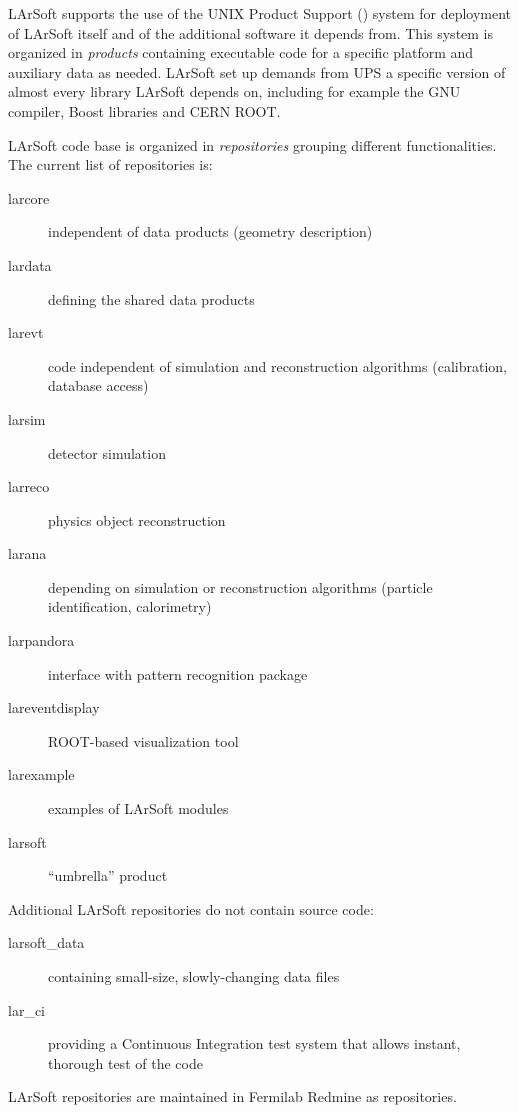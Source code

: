 
LArSoft supports the use of the UNIX Product Support (\UPS) system
for deployment of LArSoft itself and of the additional software it depends from.
This system is organized in \emph{products} containing executable code for a specific platform
and auxiliary data as needed.
LArSoft set up demands from UPS a specific version of almost every library LArSoft depends on,
including for example the GNU compiler, Boost libraries and CERN ROOT.

LArSoft code base is organized in \emph{repositories} grouping different functionalities.
The current list of repositories is:
\begin{description}
   \item[larcore] independent of data products (\eg geometry description)
   \item[lardata] defining the shared data products
   \item[larevt] code independent of simulation and reconstruction algorithms (\eg calibration, database access)
   \item[larsim] detector simulation
   \item[larreco] physics object reconstruction
   \item[larana] depending on simulation or reconstruction algorithms (\eg particle identification, calorimetry)
   \item[larpandora] interface with pattern recognition package \Pandora
   \item[lareventdisplay] ROOT-based visualization tool
   \item[larexample] examples of LArSoft modules
   \item[larsoft] ``umbrella'' product
\end{description}
Additional LArSoft repositories do not contain source code:
\begin{description}
   \item[larsoft\_data] containing small-size, slowly-changing data files
   \item[lar\_ci] providing a Continuous Integration test system that allows instant, thorough test of the code
\end{description}

LArSoft repositories are maintained in Fermilab Redmine as \git repositories.



